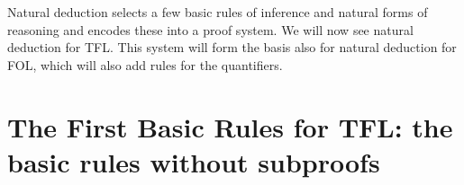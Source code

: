 Natural deduction selects a few basic rules of inference and natural forms of reasoning and encodes these into a proof system. We will now see natural deduction for TFL. This system will form the basis also for natural deduction for FOL, which will also add rules for the quantifiers.

\chapter{The First Basic Rules for TFL: the basic rules without subproofs}\label{s:BasicTFL}


%
%
%
%
%
%
%
%
%
